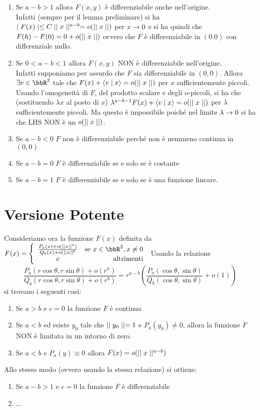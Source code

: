 \documentclass[a4paper,NoNotes,GeneralMath]{stdmdoc}
\begin{document}
	\begin{enumerate}
		\item Se $a-b > 1$ allora $F(x,y)$ è differenziabile anche nell'origine. \\
			Infatti (sempre per il lemma preliminare) si ha $\mid F(x) \mid \le C \mid\mid x \mid\mid^{a-b} = o(\mid\mid x \mid\mid)$ per $x \rightarrow 0$ e si ha
			quindi che $F(h) - F(0) = 0 + o(\mid\mid x \mid\mid)$ ovvero che $F$ è differenziabile in $(0.0)$ con differenziale nullo.
		\item Se $0 < a-b < 1$ allora $F(x,y)$ NON è differenziabile nell'origine. \\
			Infatti supponiamo per assurdo che $F$ sia differenziabile in $(0,0)$. Allora $\exists v \in \bbR^2$ tale che
			$F(x) + \langle v \mid x \rangle = o(\mid\mid x \mid\mid)$ per $x$ sufficientemente piccoli. Usando l'omogeneità di $F$, del prodotto scalare e
			degli o-piccoli, si ha che (sostituendo $\lambda x$ al posto di $x$) $\lambda ^{a-b-1} F(x) + \langle v \mid x \rangle = o(\mid\mid x \mid\mid)$
			per $\lambda$ sufficientemente piccoli. Ma questo è impossibile poiché nel limite $\lambda \rightarrow 0$ si ha che LHS NON è
			un $o(\mid\mid x \mid\mid)$.
		\item Se $ a - b < 0$ $F$ non è differenziabile perché non è nemmeno continua in $(0,0)$
		\item Se $ a - b = 0$ $F$ è differenziabile se e solo se è costante
		\item Se $ a - b = 1$ $F$ è differenziabile se e solo se è una funzione lineare.
	\end{enumerate}
	
	\section{Versione Potente}
	Consideriamo ora la funzione $F(x)$ definita da $F(x) = \left\{ \begin{array}{cr} \frac{P_a(x)+o(\norma{x}^a)}{Q_b(x)+o(\norma{x}^b} & \text{se } x\in \bbR^2, x \neq 0 \\ c & \text{altrimenti} \\ \end{array} \right.$
	Usando la relazione $$\frac{P_a(r \cos\theta, r \sin\theta) + o(r^a)}{Q_b(r \cos\theta, r \sin\theta) + o(r^b)} = r^{a-b} \left( \frac{P_a(\cos\theta, \sin\theta)}{Q_b(\cos\theta, \sin\theta)} + o(1) \right)$$ si trovano i
	seguenti casi:
	
	\begin{enumerate}
		\item Se $a > b$ e $c = 0$ la funzione $F$ è continua
		\item Se $a < b$ ed esiste $y_0$ tale che $\mid\mid y_0 \mid\mid = 1$ e $P_a(y_0) \neq 0$, allora la funzione $F$ NON è limitata in un intorno di zero.
		\item Se $a < b$ e $P_a(y) \equiv 0$ allora $F(x) = o(\mid\mid x \mid\mid^{a-b})$
	\end{enumerate}
	
	Allo stesso modo (ovvero usando la stessa relazione) si ottiene:
	\begin{enumerate}
		\item Se $a-b> 1$ e $c=0$ la funzione $F$ è differenziabile
		\item $\ldots$
	\end{enumerate}
\end{document}
